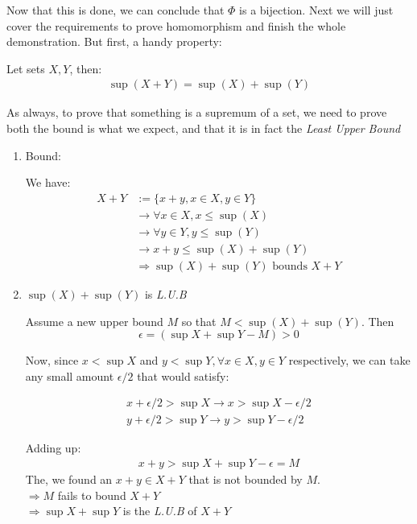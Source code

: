 Now that this is done, we can conclude that $\Phi$ is a bijection. Next we will just cover the requirements to prove homomorphism and finish the whole demonstration. But first, a handy property:

\begin{lemma}\label{le:sup-addition}
Let sets $X, Y$, then:
\begin{align*}
\sup(X + Y) = \sup(X) + \sup(Y)
\end{align*}
\end{lemma}

\begin{bookproof}
As always, to prove that something is a supremum of a set, we need to prove both the bound is what we expect, and that it is in fact the \textit{Least Upper Bound}

\begin{enumerate}
\item Bound:

We have:
\begin{align*}
X + Y &:= \{x + y, x \in X, y \in Y\} \\
&\rightarrow \forall x \in X, x \leq \sup(X) \\
&\rightarrow \forall y \in Y, y \leq \sup(Y) \\
&\rightarrow x + y \leq \sup(X) + \sup(Y) \\
&\Rightarrow \sup(X) + \sup(Y) \text{ bounds } X + Y
\end{align*}

\item $\sup(X) + \sup(Y)$ is \textit{L.U.B}

Assume a new upper bound $M$ so that $M < \sup(X) + \sup(Y)$. Then
$$
\epsilon = (\sup X + \sup Y - M) > 0
$$

Now, since $x < \sup X$ and $y < \sup Y, \forall x \in X, y \in Y$ respectively, we can take any small amount $\epsilon / 2$ that would satisfy:

\begin{align*}
x + \epsilon / 2 > \sup X \rightarrow x > \sup X - \epsilon / 2 \\
y + \epsilon / 2 > \sup Y \rightarrow y > \sup Y - \epsilon / 2
\end{align*}

Adding up:
\begin{align*}
x + y > \sup X + \sup Y - \epsilon = M
\end{align*}
The, we found an $x + y \in X + Y$ that is not bounded by $M$. \\
$\Rightarrow M$ fails to bound $X + Y$ \\
$\Rightarrow \sup X + \sup Y$ is the \textit{L.U.B} of $X + Y$
\end{enumerate}
\end{bookproof}

